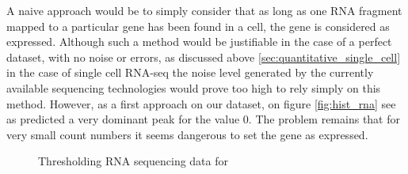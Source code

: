   A naive approach would be to simply consider that as long as one RNA fragment mapped to a particular gene has been found in a cell, the gene is considered as expressed. Although such a method would be justifiable in the case of a perfect dataset, with no noise or errors, as discussed above \ref{sec:quantitative_single_cell} in the case of single cell RNA-seq the noise level generated by the currently available sequencing technologies would prove too high to rely simply on this method. However, as a first approach on our dataset, on figure \ref{fig:hist_rna} see as predicted a very dominant peak for the value $0$. The problem remains that for very small count numbers it seems dangerous to set the gene as expressed.\\
  
\begin{figure}[bth]
        \myfloatalign
         \quad
        \caption{Thresholding RNA sequencing data for \platy{}}\label{fig:platynereis_single_cell}
\end{figure}
  
